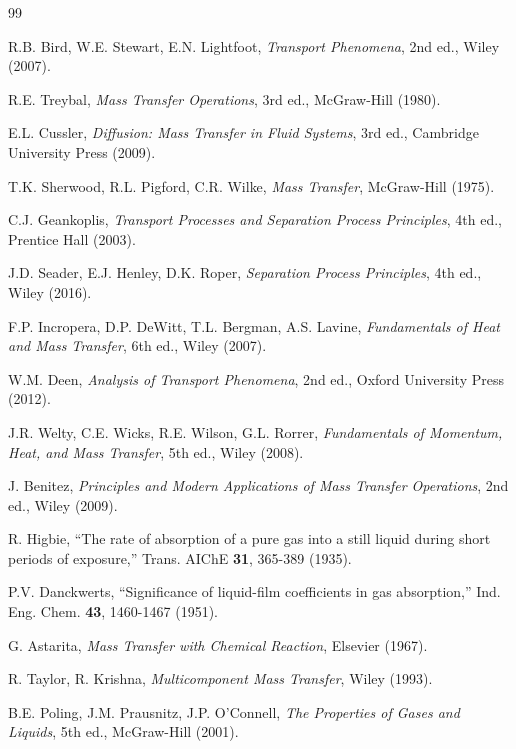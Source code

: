 \documentclass[11pt,a4paper]{article}
\begin{document}
\begin{thebibliography}{99}

R.B. Bird, W.E. Stewart, E.N. Lightfoot, \textit{Transport Phenomena}, 2nd ed., Wiley (2007).

R.E. Treybal, \textit{Mass Transfer Operations}, 3rd ed., McGraw-Hill (1980).

E.L. Cussler, \textit{Diffusion: Mass Transfer in Fluid Systems}, 3rd ed., Cambridge University Press (2009).

T.K. Sherwood, R.L. Pigford, C.R. Wilke, \textit{Mass Transfer}, McGraw-Hill (1975).

C.J. Geankoplis, \textit{Transport Processes and Separation Process Principles}, 4th ed., Prentice Hall (2003).

J.D. Seader, E.J. Henley, D.K. Roper, \textit{Separation Process Principles}, 4th ed., Wiley (2016).

F.P. Incropera, D.P. DeWitt, T.L. Bergman, A.S. Lavine, \textit{Fundamentals of Heat and Mass Transfer}, 6th ed., Wiley (2007).

W.M. Deen, \textit{Analysis of Transport Phenomena}, 2nd ed., Oxford University Press (2012).

J.R. Welty, C.E. Wicks, R.E. Wilson, G.L. Rorrer, \textit{Fundamentals of Momentum, Heat, and Mass Transfer}, 5th ed., Wiley (2008).

J. Benitez, \textit{Principles and Modern Applications of Mass Transfer Operations}, 2nd ed., Wiley (2009).

R. Higbie, ``The rate of absorption of a pure gas into a still liquid during short periods of exposure,'' Trans. AIChE \textbf{31}, 365-389 (1935).

P.V. Danckwerts, ``Significance of liquid-film coefficients in gas absorption,'' Ind. Eng. Chem. \textbf{43}, 1460-1467 (1951).

G. Astarita, \textit{Mass Transfer with Chemical Reaction}, Elsevier (1967).

R. Taylor, R. Krishna, \textit{Multicomponent Mass Transfer}, Wiley (1993).

B.E. Poling, J.M. Prausnitz, J.P. O'Connell, \textit{The Properties of Gases and Liquids}, 5th ed., McGraw-Hill (2001).


\end{thebibliography}
\end{document}
